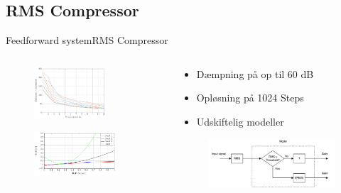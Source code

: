 \documentclass[10pt,aspectratio=169]{beamer}
\begin{document}
\subsection{RMS Compressor}
\begin{frame}{Feedforward system}{RMS Compressor}

\begin{columns}
  \begin{column}{0.5\textwidth}
\begin{figure}
\centering
\includegraphics[width=0.7\textwidth]{comp_mic12All}
\end{figure}
\vspace{-5mm}
\begin{figure}
\includegraphics[width=0.8\textwidth]{BandModelCombine}
\end{figure}
  \end{column}
  \begin{column}{0.5\textwidth}
\begin{itemize}
\item Dæmpning på op til 60 dB
\item Opløsning på 1024 Steps
\item Udskiftelig modeller
\end{itemize}
\begin{figure}
\centering
\includegraphics[width=\textwidth]{designRealRMS}
\end{figure}
  \end{column}
\end{columns}


\end{frame}
\end{document}
